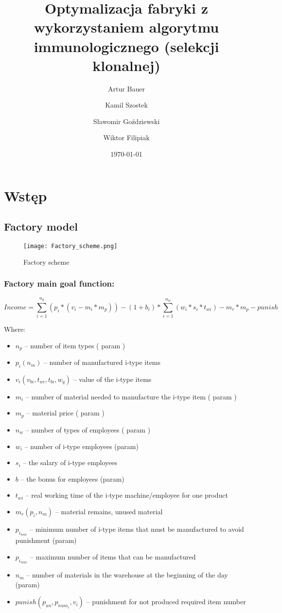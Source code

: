 \documentclass[a4paper]{article}
\title{Optymalizacja fabryki z wykorzystaniem algorytmu immunologicznego (selekcji klonalnej)}
\author{Artur Bauer \and Kamil Szostek \and Sławomir Goździewski \and Wiktor Filipiak}
\date{\today}
\begin{document}


\tableofcontents

\newpage
\section{Wstęp}
\subsection{Factory model}\label{factory}

\begin{figure}[ht]
\centering
\texttt{[image: Factory\_scheme.png]}
\caption{Factory scheme}
\end{figure}

\subsubsection{Factory main goal function:}\label{factory-main-goal-function}

$$Income = \sum^{n_p}_{i=1}(p_i*(v_i-m_i*m_p)) - (1+b_i)*\sum^{n_w}_{i = 1}(w_i*s_i *t_{wi}) - m_r*m_p - punish$$

Where:
\begin{itemize}
    \item $n_p$ -- number of item types ( param )
    \item $p_i (n_m)$ -- number of manufactured i-type items
    \item $v_i(v_{bi}, t_{wi},t_{bi},w_q)$ -- value of the i-type items
    \item $m_i$ -- number of material needed to manufacture the i-type item ( param )
    \item $m_p$ -- material price ( param )
    \item $n_w$ -- number of types of employees ( param )\item$w_i$ -- number of i-type employees (param)
    \item $s_i$ -- the salary of i-type employees\item$b$ -- the bonus for employees (param)
    \item $t_{wi}$ -- real working time of the i-type machine/employee for one product
    \item $m_r(p_i,n_m)$ -- material remains, unused material
    \item $p_{i_{min}}$ -- minimum number of i-type items that must be manufactured to avoid punishment (param) 
    \item $p_{i_{max}}$ -- maximum number of items that can be manufactured 
    \item $n_m$ -- number of materials in the warehouse at the beginning of the day (param)
    \item $punish(p_{un}, p_{num_i}, v_i)$ -- punishment for not produced required item number
\end{itemize}
\end{document}
